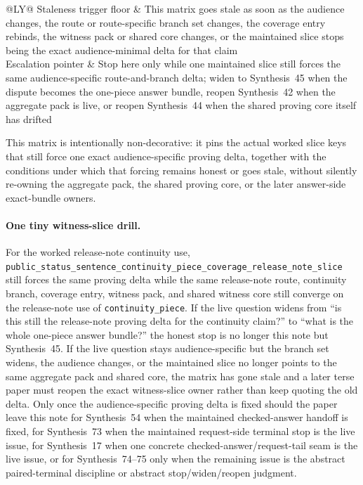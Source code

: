 \documentclass[11pt]{article}
\begin{document}
\begin{table}[t]
\begin{tabularx}{\linewidth}{@{}LY@{}}
Staleness trigger floor & This matrix goes stale as soon as the audience changes, the route or route-specific branch set changes, the coverage entry rebinds, the witness pack or shared core changes, or the maintained slice stops being the exact audience-minimal delta for that claim \\
Escalation pointer & Stop here only while one maintained slice still forces the same audience-specific route-and-branch delta; widen to Synthesis~45 when the dispute becomes the one-piece answer bundle, reopen Synthesis~42 when the aggregate pack is live, or reopen Synthesis~44 when the shared proving core itself has drifted \\
\bottomrule
\end{tabularx}
\caption{A forced public witness-slice matrix. This is the smallest audience-specific proving object later terse papers can quote directly when the live issue is whether one maintained slice still forces the same route-and-branch delta rather than merely which slice exists in the abstract.}
\label{tab:forced-public-witness-slice-matrix}
\end{table}

This matrix is intentionally non-decorative: it pins the actual worked slice keys that still force one exact audience-specific proving delta, together with the conditions under which that forcing remains honest or goes stale, without silently re-owning the aggregate pack, the shared proving core, or the later answer-side exact-bundle owners.\cite{series:workedexample}

\paragraph{One tiny witness-slice drill.}
For the worked release-note continuity use, \nolinkurl{public_status_sentence_continuity_piece_coverage_release_note_slice} still forces the same proving delta while the same release-note route, continuity branch, coverage entry, witness pack, and shared witness core still converge on the release-note use of \nolinkurl{continuity_piece}. If the live question widens from ``is this still the release-note proving delta for the continuity claim?'' to ``what is the whole one-piece answer bundle?'' the honest stop is no longer this note but Synthesis~45. If the live question stays audience-specific but the branch set widens, the audience changes, or the maintained slice no longer points to the same aggregate pack and shared core, the matrix has gone stale and a later terse paper must reopen the exact witness-slice owner rather than keep quoting the old delta. Only once the audience-specific proving delta is fixed should the paper leave this note for Synthesis~54 when the maintained checked-answer handoff is fixed, for Synthesis~73 when the maintained request-side terminal stop is the live issue, for Synthesis~17 when one concrete checked-answer/request-tail seam is the live issue, or for Synthesis~74--75 only when the remaining issue is the abstract paired-terminal discipline or abstract stop/widen/reopen judgment.\cite{series:workedexample}
\end{document}
